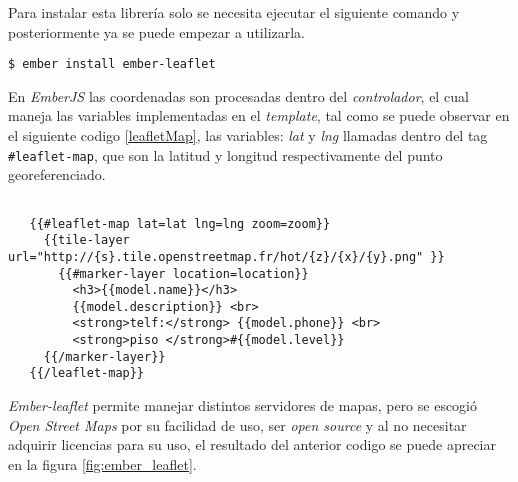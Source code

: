 Para instalar esta librería solo se necesita ejecutar el siguiente comando y posteriormente ya se puede empezar a utilizarla.\\

\begin{verbatim}
$ ember install ember-leaflet
\end{verbatim}


En \emph{EmberJS} las coordenadas son procesadas dentro del \emph{controlador}, el cual maneja las variables implementadas en el \emph{template}, tal como se puede observar en el siguiente codigo \ref{leafletMap}, las variables: \emph{lat} y \emph{lng} llamadas dentro del tag \verb|#leaflet-map|, que son la latitud y longitud respectivamente del punto georeferenciado. \\


\begin{center}
 \begin{lstlisting}[label=leafletMap,caption=Método para obtener la información de un lugar.]

   {{#leaflet-map lat=lat lng=lng zoom=zoom}}
     {{tile-layer url="http://{s}.tile.openstreetmap.fr/hot/{z}/{x}/{y}.png" }}
       {{#marker-layer location=location}}
         <h3>{{model.name}}</h3>
         {{model.description}} <br>
         <strong>telf:</strong> {{model.phone}} <br>
         <strong>piso </strong>#{{model.level}}
     {{/marker-layer}}
   {{/leaflet-map}}

 \end{lstlisting}
\end{center}

\emph{Ember-leaflet} permite manejar distintos servidores de mapas, pero se escogió \emph{Open Street Maps} por su facilidad de uso, ser \emph{open source} y al no necesitar adquirir licencias para su uso, el resultado del anterior codigo se puede apreciar en la figura \ref{fig:ember_leaflet}. \\

